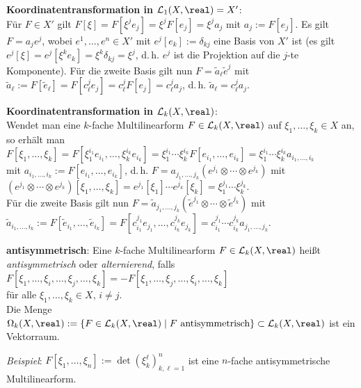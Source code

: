 \textbf{Koordinatentransformation in $\L_1(X, \real) = X'$}: \\
Für $F \in X'$ gilt $F[\xi] = F[\xi^j e_j] = \xi^j F[e_j] = \xi^j a_j$
mit $a_j := F[e_j]$. 
Es gilt $F = a_j e^j$, wobei $e^1, \dotsc, e^n \in X'$ mit
$e^j[e_k] := \delta_{kj}$ eine Basis von $X'$ ist
(es gilt $e^j[\xi] = e^j[\xi^k e_k] = \xi^k \delta_{kj} = \xi^j$, d.\,h.
$e^j$ ist die Projektion auf die $j$-te Komponente).
Für die zweite Basis gilt nun $F = \widetilde{a}_\ell \widetilde{e}^j$ mit
$\widetilde{a}_\ell := F[\widetilde{e}_\ell] = F[c_\ell^j e_j] =
c_\ell^j F[e_j] = c_\ell^j a_j$, d.\,h.
$\widetilde{a}_\ell = c_\ell^j a_j$.

\textbf{Koordinatentransformation in $\L_k(X, \real)$}: \\
Wendet man eine $k$-fache Multilinearform $F \in \L_k(X, \real)$ auf
$\xi_1, \dotsc, \xi_k \in X$ an, so erhält man
$F[\xi_1, \dotsc, \xi_k] =
F[\xi_1^{i_1} e_{i_1}, \dotsc, \xi_k^{i_k} e_{i_k}] =
\xi_1^{i_1} \dotsm \xi_k^{i_k} F[e_{i_1}, \dotsc, e_{i_k}] =
\xi_1^{i_1} \dotsm \xi_k^{i_k} a_{i_1, \dotsc, i_k}$ \\
mit $a_{i_1, \dotsc, i_k} := F[e_{i_1}, \dotsc, e_{i_k}]$, d.\,h.
$F = a_{j_1, \dotsc, j_k} (e^{j_1} \otimes \dotsb \otimes e^{j_k})$ mit \\
$(e^{j_1} \otimes \dotsb \otimes e^{j_k})[\xi_1, \dotsc, \xi_k] =
e^{j_1}[\xi_1] \dotsm e^{j_k}[\xi_k] =
\xi_1^{j_1} \dotsm \xi_k^{j_k}$. \\
Für die zweite Basis gilt nun
$F = \widetilde{a}_{j_1, \dotsc, j_k}
(\widetilde{e}^{j_1} \otimes \dotsb \otimes \widetilde{e}^{j_k})$ mit \\
$\widetilde{a}_{i_1, \dotsc, i_k} :=
F[\widetilde{e}_{i_1}, \dotsc, \widetilde{e}_{i_k}] =
F[c_{i_1}^{j_1} e_{j_1}, \dotsc, c_{i_k}^{j_k} e_{j_k}] =
c_{i_1}^{j_1} \dotsm c_{i_k}^{j_k} a_{j_1, \dotsc, j_k}$.

\linie

\textbf{antisymmetrisch}:
Eine $k$-fache Multilinearform $F \in \L_k(X, \real)$ heißt
\emph{antisymmetrisch} oder \emph{alternierend}, falls
$F[\xi_1, \dotsc, \xi_i, \dotsc, \xi_j, \dotsc, \xi_k] =
-F[\xi_1, \dotsc, \xi_j, \dotsc, \xi_i, \dotsc, \xi_k]$ \\
für alle $\xi_1, \dotsc, \xi_k \in X$, $i \not= j$. \\
Die Menge $\Omega_k(X, \real) :=
\{F \in \L_k(X, \real) \;|\; F \text{ antisymmetrisch}\}
\subset \L_k(X, \real)$ ist ein Vektorraum.

\emph{Beispiel}:
$F[\xi_1, \dotsc, \xi_n] := \det(\xi_k^\ell)_{k,\ell=1}^n$ ist eine $n$-fache
antisymmetrische Multilinearform.

